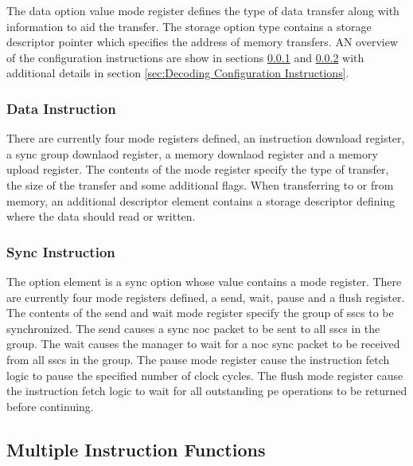 The data option value mode register \cite{standard2007jedec} defines the type of data transfer along with information to aid the transfer. 
The storage option type contains a storage descriptor pointer which specifies the address of memory transfers.
AN overview of the configuration instructions are show in sections \ref{sec:Data Transfer Instruction} and \ref{sec:Sync Instruction} with additional details in section \ref{sec:Decoding Configuration Instructions}.

\subsubsection{Data Instruction}
\label{sec:Data Transfer Instruction}

There are currently four mode registers defined, an instruction download register, a sync group downlaod register, a memory downlaod register and a memory upload register.
The contents of the mode register specify the type of transfer, the size of the transfer and some additional flags.
When transferring to or from memory, an additional descriptor element contains a storage descriptor defining where the data should read or written.

\subsubsection{Sync Instruction}
\label{sec:Sync Instruction}

The option element is a sync option whose value contains a mode register.
There are currently four mode registers defined, a send, wait, pause and a flush register.
The contents of the send and wait mode register specify the group of \acp{ssc} to be synchronized. 
The send causes a sync \ac{noc} packet to be sent to all \acp{ssc} in the group.
The wait causes the manager to wait for a \ac{noc} sync packet to be received from all \acp{ssc} in the group.
The pause mode register cause the instruction fetch logic to pause the specified number of clock cycles.
The flush mode register cause the instruction fetch logic to wait for all outstanding \ac{pe} operations to be returned before continuing.

\subsection{Multiple Instruction Functions}
\label{sec:Multiple Instruction Functions}

